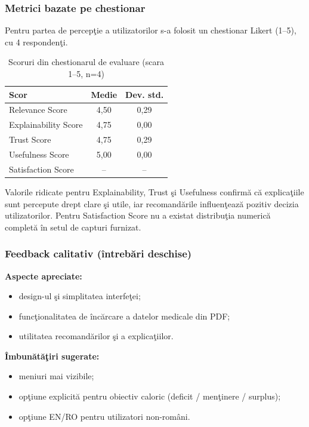 \documentclass[12pt,a4paper]{article}
\begin{document}
\subsubsection*{Metrici bazate pe chestionar}

Pentru partea de percep\c{t}ie a utilizatorilor s-a folosit un chestionar Likert (1--5), cu 4 responden\c{t}i.

\begin{table}[h!]
  \centering
  \caption{Scoruri din chestionarul de evaluare (scara 1--5, n=4)}
  \label{tab:questionnaire}
  \vspace{4pt}
  \small
  \begin{tabular}{@{}lcc@{}}
    \toprule
    \textbf{Scor} & \textbf{Medie} & \textbf{Dev. std.} \\
    \midrule
    Relevance Score      & 4{,}50 & 0{,}29 \\
    Explainability Score & 4{,}75 & 0{,}00 \\
    Trust Score          & 4{,}75 & 0{,}29 \\
    Usefulness Score     & 5{,}00 & 0{,}00 \\
    Satisfaction Score   & -- & -- \\
    \bottomrule
  \end{tabular}
\end{table}

Valorile ridicate pentru Explainability, Trust \c{s}i Usefulness confirm\u{a} c\u{a} explica\c{t}iile sunt percepute drept clare \c{s}i utile, iar recomand\u{a}rile influen\c{t}eaz\u{a} pozitiv decizia utilizatorilor. Pentru Satisfaction Score nu a existat distribu\c{t}ia numeric\u{a} complet\u{a} \^{i}n setul de capturi furnizat.

\subsubsection*{Feedback calitativ (întrebări deschise)}

\textbf{Aspecte apreciate:}
\begin{itemize}
  \item design-ul \c{s}i simplitatea interfe\c{t}ei;
  \item func\c{t}ionalitatea de \^{i}nc\u{a}rcare a datelor medicale din PDF;
  \item utilitatea recomand\u{a}rilor \c{s}i a explica\c{t}iilor.
\end{itemize}

\textbf{Îmbunătă\c{t}iri sugerate:}
\begin{itemize}
  \item meniuri mai vizibile;
  \item op\c{t}iune explicit\u{a} pentru obiectiv caloric (deficit / men\c{t}inere / surplus);
  \item op\c{t}iune EN/RO pentru utilizatori non-români.
\end{itemize}
\end{document}

